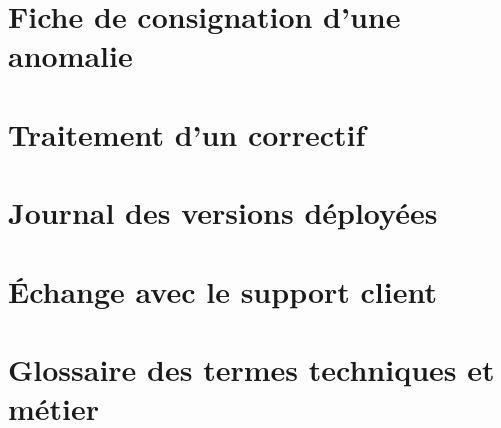 \documentclass[11pt,twoside]{report}
\begin{document}
    \chapter{Fiche de consignation d'une anomalie}
    

    \chapter{Traitement d'un correctif}
    

    \chapter{Journal des versions déployées}
    

    \chapter{Échange avec le support client}
    

    \chapter{Glossaire des termes techniques et métier}
    

    \printbibliography
\end{document}
